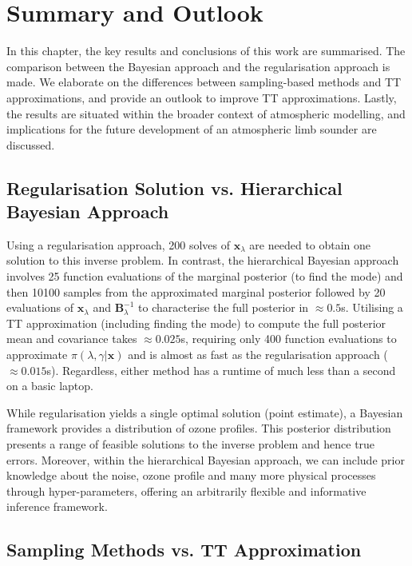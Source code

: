 \chapter{Summary and Outlook}
\label{ch:Concl}

In this chapter, the key results and conclusions of this work are summarised.
The comparison between the Bayesian approach and the regularisation approach is made.
We elaborate on the differences between sampling-based methods and TT approximations, and provide an outlook to improve TT approximations.
Lastly, the results are situated within the broader context of atmospheric modelling, and implications for the future development of an atmospheric limb sounder are discussed.




\section{Regularisation Solution vs. Hierarchical Bayesian Approach}
Using a regularisation approach, 200 solves of $\bm{x}_{\lambda}$ are needed to obtain one solution to this inverse problem.
In contrast, the hierarchical Bayesian approach involves 25 function evaluations of the marginal posterior (to find the mode) and then 10100 samples from the approximated marginal posterior followed by 20 evaluations of $\bm{x}_{\lambda}$ and $\bm{B}^{-1}_{\lambda}$ to characterise the full posterior in $\approx 0.5$s.
Utilising a TT approximation (including finding the mode) to compute the full posterior mean and covariance takes $\approx 0.025$s, requiring only 400 function evaluations to approximate $\pi(\lambda, \gamma | \bm{x})$ and is almost as fast as the regularisation approach ($\approx 0.015$s).
Regardless, either method has a runtime of much less than a second on a basic laptop.

While regularisation yields a single optimal solution (point estimate), a Bayesian framework provides a distribution of ozone profiles.
This posterior distribution presents a range of feasible solutions to the inverse problem and hence true errors.
Moreover, within the hierarchical Bayesian approach, we can include prior knowledge about the noise, ozone profile and many more physical processes through hyper-parameters, offering an arbitrarily flexible and informative inference framework.


\section{Sampling Methods vs. TT Approximation}



